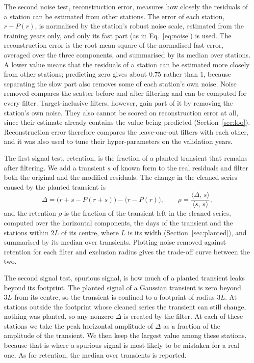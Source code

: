 \documentclass[preprint,12pt,authoryear]{elsarticle}
\begin{document}
The second noise test, reconstruction error, measures how closely the residuals of a station can be estimated from other stations. The error of each station, $r - P(r)$, is normalised by the station's robust noise scale, estimated from the training years only, and only its fast part (as in Eq.~\ref{eq:noise}) is used. The reconstruction error is the root mean square of the normalised fast error, averaged over the three components, and summarised by its median over stations. A lower value means that the residuals of a station can be estimated more closely from other stations; predicting zero gives about 0.75 rather than 1, because separating the slow part also removes some of each station's own noise. Noise removed compares the scatter before and after filtering and can be computed for every filter. Target-inclusive filters, however, gain part of it by removing the station's own noise. They also cannot be scored on reconstruction error at all, since their estimate already contains the value being predicted (Section~\ref{sec:loo}). Reconstruction error therefore compares the leave-one-out filters with each other, and it was also used to tune their hyper-parameters on the validation years.

The first signal test, retention, is the fraction of a planted transient that remains after filtering. We add a transient $s$ of known form to the real residuals and filter both the original and the modified residuals. The change in the cleaned series caused by the planted transient is
\begin{equation}
  \Delta = \big(r + s - P(r+s)\big) - \big(r - P(r)\big),
  \qquad
  \rho = \frac{\langle \Delta,\, s \rangle}{\langle s,\, s \rangle},
  \label{eq:retention}
\end{equation}
and the retention $\rho$ is the fraction of the transient left in the cleaned series, computed over the horizontal components, the days of the transient and the stations within $2L$ of its centre, where $L$ is its width (Section~\ref{sec:planted}), and summarised by its median over transients. Plotting noise removed against retention for each filter and exclusion radius gives the trade-off curve between the two.

The second signal test, spurious signal, is how much of a planted transient leaks beyond its footprint. The planted signal of a Gaussian transient is zero beyond $3L$ from its centre, so the transient is confined to a footprint of radius $3L$. At stations outside the footprint whose cleaned series the transient can still change, nothing was planted, so any nonzero $\Delta$ is created by the filter. At each of these stations we take the peak horizontal amplitude of $\Delta$ as a fraction of the amplitude of the transient. We then keep the largest value among these stations, because that is where a spurious signal is most likely to be mistaken for a real one. As for retention, the median over transients is reported.
\end{document}

